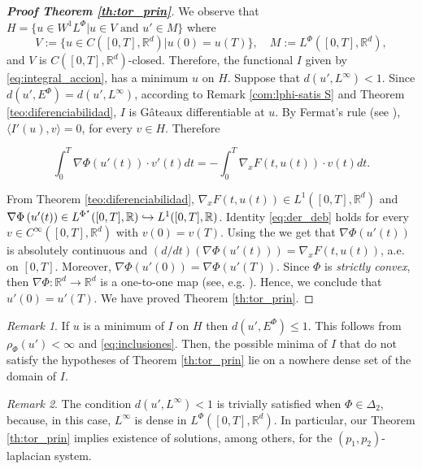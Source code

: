 \documentclass[twoside]{article}
\theoremstyle{remark}
\newtheorem{comentario}{Remark}
\newcommand{\lphi}{L^{\Phi}}
\newcommand{\lpsi}{L^{\Phi^{\star}}}
\newcommand{\ephi}{E^{\Phi}}
\newcommand{\wphi}{W^{1}\lphi}
\newcommand{\rr}{\mathbb{R}}
\renewcommand{\leq}{\leqslant}
\begin{document}
\begin{proof}[\textbf{Proof Theorem \ref{th:tor_prin}}] We observe that $H=\{u\in \wphi | u\in V\text{ and } u'\in M\}$ where 
\[V:=\{u\in C([0,T],\rr^d)|u(0)=u(T)\},\quad M:=\lphi([0,T],\rr^d),\]
and $V$ is $C([0,T],\rr^d)$-closed. Therefore, the functional $I$ given by \eqref{eq:integral_accion}, has a minimum $u$ on  $H$. Suppose that $d(u',L^{\infty})<1$.
Since $d(u',\ephi)=d(u',L^{\infty})$, according to Remark \ref{com:lphi-satis S} and Theorem \ref{teo:diferenciabilidad}, $I$ is G\^ateaux differentiable at $u$. By Fermat's rule (see \cite[Prop. 4.12]{clarke2013functional}), $\langle I'(u),v\rangle=0$, for every $v\in H$. Therefore

\begin{equation}\label{eq:der_deb}\int_0^T\nabla\Phi(u'(t))\cdot v'(t)dt=-\int_0^T \nabla_xF(t,u(t))\cdot v(t)dt.\end{equation}

From Theorem \ref{teo:diferenciabilidad}, $\nabla_xF(t,u(t))\in L^1([0,T],\rr^d)$ and  $\nabla\Phi\left(u'(t)\right)\in\linebreak\lpsi([0,T],\rr)\hookrightarrow L^1([0,T],\rr)$.  Identity \eqref{eq:der_deb} holds for every $v\in C^{\infty} ([0,T],\rr^d)$ with $v(0)=v(T)$. Using the \cite[Fundamental Lemma, p. 6]{mawhin2010critical} we get that $\nabla\Phi(u'(t))$ is absolutely continuous and $(d/dt)\left(\nabla\Phi(u'(t))\right) = \nabla_xF(t,u(t))$, a.e. on $[0,T]$. Moreover, $\nabla\Phi(u'(0))=\nabla\Phi(u'(T))$. Since  $\Phi$ is \emph{strictly convex},  then  $\nabla\Phi:\mathbb{R}^d\to\mathbb{R}^d$ is a one-to-one map  (see, e.g. \cite[Ex. 4.17, p. 67]{clarke2013functional}). Hence, we conclude that $u'(0)=u'(T)$.  We have proved Theorem \ref{th:tor_prin}.
\end{proof}



\begin{comentario} If $u$ is a minimum of $I$ on $H$ then  $d(u',\ephi)\leq 1$. This follows from $\rho_{\Phi}(u')<\infty$ and \eqref{eq:inclusiones}. Then, the possible minima of $I$ that do not satisfy the hypotheses of  Theorem \ref{th:tor_prin} lie on a nowhere dense set of the domain of $I$.
 
\end{comentario}

\begin{comentario} The condition $d(u',L^{\infty})< 1$ is trivially satisfied when $\Phi \in \Delta_2$, because, in this case, $L^{\infty}$ is dense in $\lphi([0,T],\rr^d)$. In particular, our Theorem \ref{th:tor_prin} implies existence of solutions, among others, for the $(p_1,p_2)$-laplacian system. 
\end{comentario}
\end{document}
